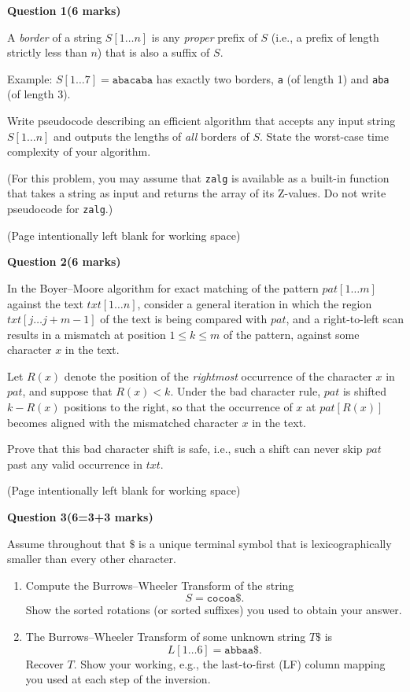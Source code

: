 \documentclass[12pt,letterpaper]{article}
\newcommand{\marksbox}[1]{%
  \vfill
  \begin{flushright}
    \fbox{\parbox[c][1.1cm][c]{1.3cm}{\centering #1}}
  \end{flushright}
}
\newcommand{\questiontitle}[2]{%
  \textbf{Question #1}\hfill\textbf{(#2 marks)}
}
\newcommand{\workingpage}{%
  \newpage
  \begin{center}
    (Page intentionally left blank for working space)
  \end{center}
}
\begin{document}
\newpage

\questiontitle{1}{6}

A \emph{border} of a string $S[1 \ldots n]$ is any \emph{proper} prefix of $S$
(i.e., a prefix of length strictly less than $n$) that is also a suffix of $S$.

Example: $S[1 \ldots 7] = \texttt{abacaba}$ has exactly two borders,
\texttt{a} (of length 1) and \texttt{aba} (of length 3).

Write pseudocode describing an efficient algorithm that accepts any input
string $S[1 \ldots n]$ and outputs the lengths of \emph{all} borders of $S$.
State the worst-case time complexity of your algorithm.

(For this problem, you may assume that \texttt{zalg} is available as a built-in
function that takes a string as input and returns the array of its Z-values.
Do not write pseudocode for \texttt{zalg}.)

\marksbox{6}

\workingpage
\newpage

\questiontitle{2}{6}

In the Boyer--Moore algorithm for exact matching of the pattern
$pat[1 \ldots m]$ against the text $txt[1 \ldots n]$, consider a general
iteration in which the region $txt[j \ldots j+m-1]$ of the text is being
compared with $pat$, and a right-to-left scan results in a mismatch at
position $1 \leq k \leq m$ of the pattern, against some character $x$ in the
text.

Let $R(x)$ denote the position of the \emph{rightmost} occurrence of the
character $x$ in $pat$, and suppose that $R(x) < k$. Under the bad character
rule, $pat$ is shifted $k - R(x)$ positions to the right, so that the
occurrence of $x$ at $pat[R(x)]$ becomes aligned with the mismatched character
$x$ in the text.

Prove that this bad character shift is safe, i.e., such a shift can never skip
$pat$ past any valid occurrence in $txt$.

\marksbox{6}

\workingpage
\newpage

\questiontitle{3}{6=3+3}

Assume throughout that $\$$ is a unique terminal symbol that is
lexicographically smaller than every other character.

\begin{enumerate}
  \item[(i)] Compute the Burrows--Wheeler Transform of the string
  \[
    S = \texttt{cocoa\$}.
  \]
  Show the sorted rotations (or sorted suffixes) you used to obtain your
  answer.

  \item[(ii)] The Burrows--Wheeler Transform of some unknown string $T\$$ is
  \[
    L[1 \ldots 6] = \texttt{abbaa\$}.
  \]
  Recover $T$. Show your working, e.g., the last-to-first (LF) column mapping
  you used at each step of the inversion.
\end{enumerate}
\end{document}
